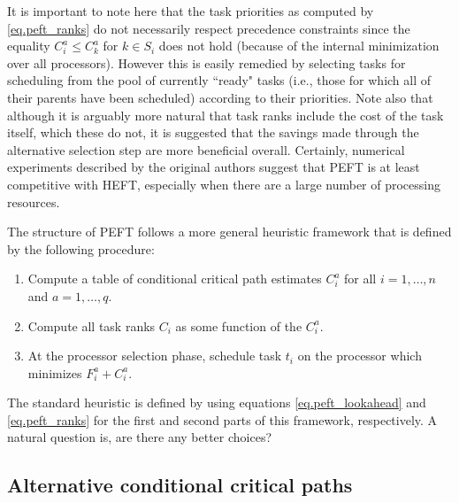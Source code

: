 \documentclass[12pt]{article}
\begin{document}
It is important to note here that the task priorities as computed by \eqref{eq.peft_ranks} do not necessarily respect precedence constraints since the equality $C_i^a \leq C_k^a$ for $k \in S_i$ does not hold (because of the internal minimization over all processors). However this is easily remedied by selecting tasks for scheduling from the pool of currently ``ready" tasks (i.e., those for which all of their parents have been scheduled) according to their priorities. Note also that although it is arguably more natural that task ranks include the cost of the task itself, which these do not, it is suggested that the savings made through the alternative selection step are more beneficial overall. Certainly, numerical experiments described by the original authors \cite{arabnejad14} suggest that PEFT is at least competitive with HEFT, especially when there are a large number of processing resources. 

The structure of PEFT follows a more general heuristic framework that is defined by the following procedure:
\begin{enumerate}
	\item Compute a table of conditional critical path estimates $C_i^a$ for all $i = 1, \dots, n$ and $a = 1, \dots, q$.
	\item Compute all task ranks $C_i$ as some function of the $C_i^a$.
	\item At the processor selection phase, schedule task $t_i$ on the processor which minimizes $F_i^a + C_i^a$.
\end{enumerate}
The standard heuristic is defined by using equations \eqref{eq.peft_lookahead} and \eqref{eq.peft_ranks} for the first and second parts of this framework, respectively. A natural question is, are there any better choices? 

\subsection{Alternative conditional critical paths}
\label{subsect.alt_cond_cp}
\end{document}
